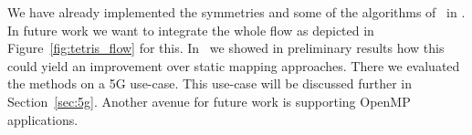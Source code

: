 We have already implemented the symmetries and some of the algorithms of~\cite{khasanov_date20} in \mocasin.
 In future work we want to integrate the whole flow as depicted in Figure~\ref{fig:tetris_flow} for this.
In~\cite{menard_rapido21} we showed in preliminary results how this could yield an improvement over static mapping approaches.
There we evaluated the methods on a 5G use-case. This use-case will be discussed further in Section~\ref{sec:5g}.
Another avenue for future work is supporting OpenMP applications.
